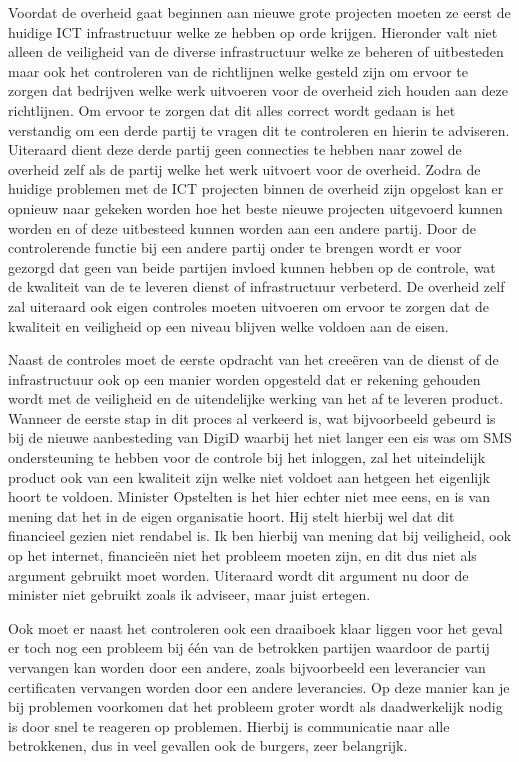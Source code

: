Voordat de overheid gaat beginnen aan nieuwe grote projecten moeten ze eerst de huidige ICT infrastructuur welke ze hebben op orde krijgen. Hieronder valt niet alleen de veiligheid van de diverse infrastructuur welke ze beheren of uitbesteden maar ook het controleren van de richtlijnen welke gesteld zijn om ervoor te zorgen dat bedrijven welke werk uitvoeren voor de overheid zich houden aan deze richtlijnen. Om ervoor te zorgen dat dit alles correct wordt gedaan is het verstandig om een derde partij te vragen dit te controleren en hierin te adviseren. Uiteraard dient deze derde partij geen connecties te hebben naar zowel de overheid zelf als de partij welke het werk uitvoert voor de overheid. Zodra de huidige problemen met de ICT projecten binnen de overheid zijn opgelost kan er opnieuw naar gekeken worden hoe het beste nieuwe projecten uitgevoerd kunnen worden en of deze uitbesteed kunnen worden aan een andere partij. Door de controlerende functie bij een andere partij onder te brengen wordt er voor gezorgd dat geen van beide partijen invloed kunnen hebben op de controle, wat de kwaliteit van de te leveren dienst of infrastructuur verbeterd. De overheid zelf zal uiteraard ook eigen controles moeten uitvoeren om ervoor te zorgen dat de kwaliteit en veiligheid op een niveau blijven welke voldoen aan de eisen. 

Naast de controles moet de eerste opdracht van het cree\"{e}ren van de dienst of de infrastructuur ook op een manier worden opgesteld dat er rekening gehouden wordt met de veiligheid en de uitendelijke werking van het af te leveren product. Wanneer de eerste stap in dit proces al verkeerd is, wat bijvoorbeeld gebeurd is bij de nieuwe aanbesteding van DigiD waarbij het niet langer een eis was om SMS ondersteuning te hebben voor de controle bij het inloggen, zal het uiteindelijk product ook van een kwaliteit zijn welke niet voldoet aan hetgeen het eigenlijk hoort te voldoen. Minister Opstelten is het hier echter niet\cite{bib.tweakers.opstelten} mee eens, en is van mening dat het in de eigen organisatie hoort. Hij stelt hierbij wel dat dit financieel gezien niet rendabel is. Ik ben hierbij van mening dat bij veiligheid, ook op het internet, financie\"{e}n niet het probleem moeten zijn, en dit dus niet als argument gebruikt moet worden. Uiteraard wordt dit argument nu door de minister niet gebruikt zoals ik adviseer, maar juist ertegen.

Ook moet er naast het controleren ook een draaiboek klaar liggen voor het geval er toch nog een probleem bij  \'{e}\'{e}n van de betrokken partijen waardoor de partij vervangen kan worden door een andere, zoals bijvoorbeeld een leverancier van certificaten vervangen worden door een andere leverancies. Op deze manier kan je bij problemen voorkomen dat het probleem groter wordt als daadwerkelijk nodig is door snel te reageren op problemen. Hierbij is communicatie naar alle betrokkenen, dus in veel gevallen ook de burgers, zeer belangrijk.

